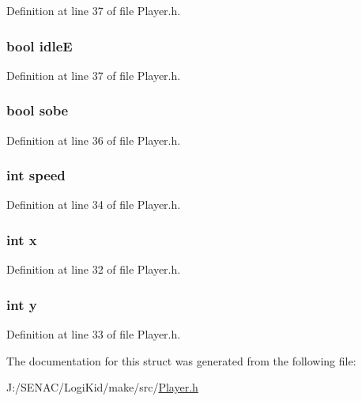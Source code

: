 Definition at line 37 of file Player.\-h.

\hypertarget{struct_state_a77820c4afecbfbb8d401a746086f7f9f}{
\subsubsection[{idle\-E}]{\setlength{\rightskip}{0pt plus 5cm}bool idle\-E}}\label{struct_state_a77820c4afecbfbb8d401a746086f7f9f}


Definition at line 37 of file Player.\-h.

\hypertarget{struct_state_a5f444f9fb63ff35f1199d30e371fca9c}{
\subsubsection[{sobe}]{\setlength{\rightskip}{0pt plus 5cm}bool sobe}}\label{struct_state_a5f444f9fb63ff35f1199d30e371fca9c}


Definition at line 36 of file Player.\-h.

\hypertarget{struct_state_a218b4f7c6cc2681a99c23a3b089d68b1}{
\subsubsection[{speed}]{\setlength{\rightskip}{0pt plus 5cm}int speed}}\label{struct_state_a218b4f7c6cc2681a99c23a3b089d68b1}


Definition at line 34 of file Player.\-h.

\hypertarget{struct_state_a6150e0515f7202e2fb518f7206ed97dc}{
\subsubsection[{x}]{\setlength{\rightskip}{0pt plus 5cm}int x}}\label{struct_state_a6150e0515f7202e2fb518f7206ed97dc}


Definition at line 32 of file Player.\-h.

\hypertarget{struct_state_a0a2f84ed7838f07779ae24c5a9086d33}{
\subsubsection[{y}]{\setlength{\rightskip}{0pt plus 5cm}int y}}\label{struct_state_a0a2f84ed7838f07779ae24c5a9086d33}


Definition at line 33 of file Player.\-h.



The documentation for this struct was generated from the following file\-:\begin{DoxyCompactItemize}
\item 
J\-:/\-S\-E\-N\-A\-C/\-Logi\-Kid/make/src/\hyperlink{_player_8h}{Player.\-h}\end{DoxyCompactItemize}
